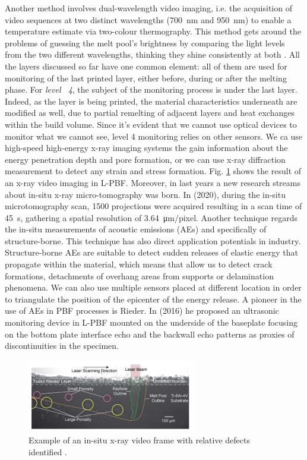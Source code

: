 Another method involves dual-wavelength video imaging, i.e. the acquisition of video sequences at two distinct wavelengths (\SI{700}{\nano\metre} and \SI{950}{\nano\metre}) to enable a temperature estimate via two-colour thermography. This method gets around the problems of guessing the melt pool's brightness by comparing the light levels from the two different wavelengths, thinking they shine consistently at both \cite{williams_situ_2019}.
All the layers discussed so far have one common element: all of them are used for monitoring of the last printed layer, either before, during or after the melting phase. For \emph{level ~4}, the subject of the monitoring process is under the last layer. Indeed, as the layer is being printed, the material characteristics underneath are modified as well, due to partial remelting of adjacent layers and heat exchanges within the build volume. Since it's evident that we cannot use optical devices to monitor what we cannot see, level 4 monitoring relies on other sensors. We ca use high-speed high-energy x-ray imaging systems the gain information about the energy penetration depth and pore formation, or we can use x-ray diffraction measurement to detect any strain and stress formation. Fig. \ref{fig:xray4} shows the result of an x-ray video imaging in L-PBF. Moreover, in last years a new research streams about in-situ x-ray micro-tomography was born. In \citeauthor{lhuissier_situ_2020} (2020), during the in-situ microtomography scan, 1500 projections were acquired resulting in a scan time of \SI{45}{s}, gathering a spatial resolution of \SI{3.64}{\micro\metre / pixel}. Another technique regards the in-situ measurements of acoustic emissions (AEs) and specifically of structure-borne. This technique has also direct application potentials in industry. Structure-borne AEs are suitable to detect sudden releases of elastic energy that propagate within the material, which means that allow us to detect crack formations, detachments of overhang areas from supports or delamination phenomena. We can also use multiple sensors placed at different location in order to triangulate the position of the epicenter of the energy release. A pioneer in the use of AEs in PBF processes is Rieder. In \citeauthor{rieder_-_2016} (2016) he proposed an ultrasonic monitoring device in L-PBF mounted on the underside of the baseplate focusing on the bottom plate interface echo and the backwall echo patterns as proxies of discontinuities in the specimen.
\begin{figure}
    \centering
    \includegraphics[width=0.65\textwidth]{Images/xray4.png}
    \caption[X-ray video frame.]{Example of an in-situ x-ray video frame with relative defects identified \cite{paulson_correlations_2020}.}
    \label{fig:xray4}
\end{figure}
